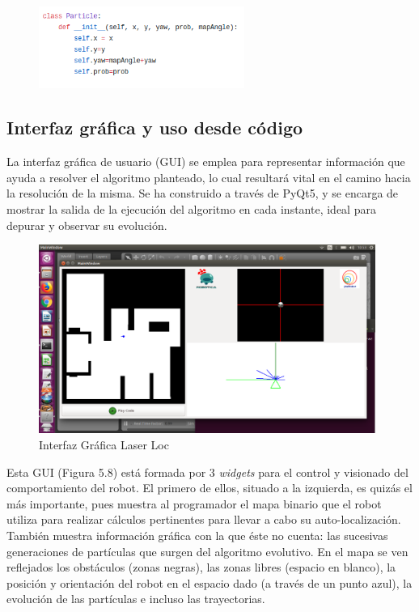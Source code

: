 \begin{figure}[H]
	\begin{center}
		\includegraphics[width=0.6\textwidth]{figures/claseparticle.png}
		\label{fig.claseparticle}
		\end{center}
\end{figure}

\subsection{Interfaz gráfica y uso desde código}
La interfaz gráfica de usuario (GUI) se emplea para representar información que ayuda a resolver el algoritmo planteado, lo cual resultará vital en el camino hacia la resolución de la misma. Se ha construido a través de PyQt5, y se encarga de mostrar la salida de la ejecución del algoritmo en cada instante, ideal para depurar y observar su evolución.

\begin{figure}[H]
  \begin{center}
    \includegraphics[width=0.98\textwidth]{figures/llgui.png}
		\caption{Interfaz Gráfica Laser Loc}
		\label{fig.llgui}
		\end{center}
\end{figure}

Esta GUI (Figura 5.8) está formada por 3 \textit{widgets} para el control y visionado del comportamiento del robot. El primero de ellos, situado a la izquierda, es quizás el más importante, pues muestra al programador el mapa binario que el robot utiliza para realizar cálculos pertinentes para llevar a cabo su auto-localización. También muestra información gráfica con la que éste no cuenta: las sucesivas generaciones de partículas que surgen del algoritmo evolutivo. En el mapa se ven reflejados los obstáculos (zonas negras), las zonas libres (espacio en blanco), la posición y orientación del robot en el espacio dado (a través de un punto azul), la evolución de las partículas e incluso las trayectorias.
 
